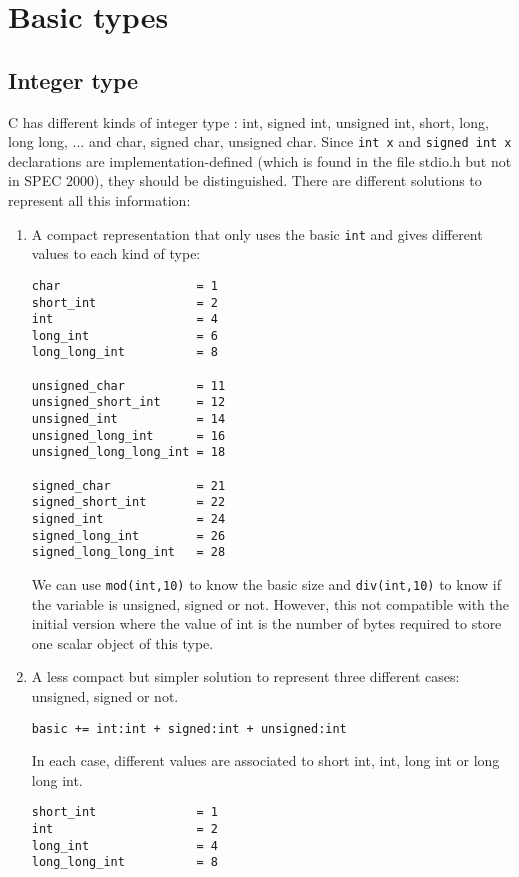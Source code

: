 \documentclass[a4paper]{report}
\begin{document}
\section{Basic types}

\subsection{Integer type}
\label{int}

C has different kinds of integer type : int, signed int, unsigned int,
short, long, long long, ... and char, signed char, unsigned char. Since 
\verb/int x/ and  \verb/signed int x/ declarations are
implementation-defined (which is found in the file
stdio.h but not in SPEC 2000), they should be distinguished. 
There are different solutions to represent all this information:
\begin{enumerate}
\item A compact representation that only uses the basic \verb/int/ and gives different values to
each kind of type:
\begin{verbatim}
char                   = 1
short_int              = 2
int                    = 4
long_int               = 6
long_long_int          = 8

unsigned_char          = 11
unsigned_short_int     = 12
unsigned_int           = 14
unsigned_long_int      = 16
unsigned_long_long_int = 18

signed_char            = 21
signed_short_int       = 22
signed_int             = 24
signed_long_int        = 26
signed_long_long_int   = 28
\end{verbatim}
We can use \verb/mod(int,10)/ to know the basic size  and
\verb/div(int,10)/ to know if the variable is unsigned, signed
or not. However, this  not compatible with the initial version
\cite{Coel01} where the value
of int is the number of bytes required to store one scalar object of this
type. 
\item A less compact but simpler solution to represent three different
  cases: unsigned, signed or not. 

\verb/basic += int:int + signed:int + unsigned:int/

In each case, different values are associated to short int,
int, long int or long long int. 
\begin{verbatim}
short_int              = 1
int                    = 2
long_int               = 4
long_long_int          = 8
\end{verbatim}
\end{enumerate}
\end{document}
